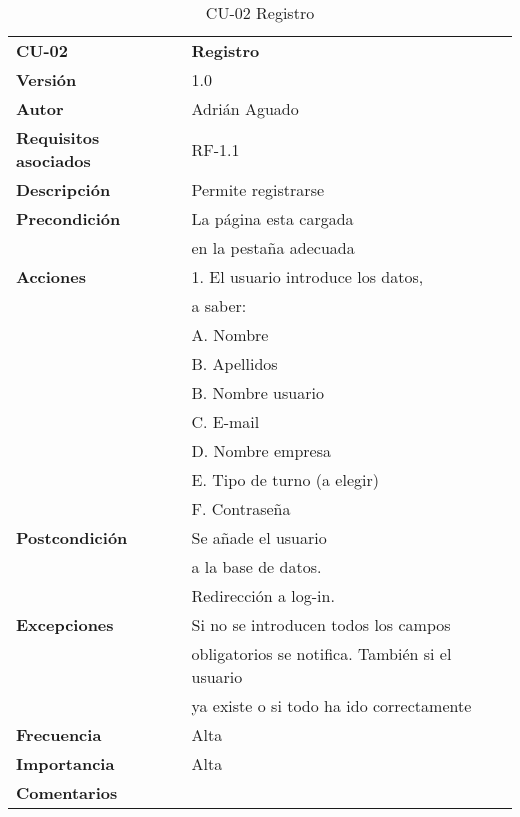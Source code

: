 \begin{table}
\begin{tabular}{llr}  
\toprule
\begin{minipage}[b]{0.24\columnwidth}\raggedright\strut
\textbf{CU-02}\strut
\end{minipage} & \begin{minipage}[b]{0.72\columnwidth}\raggedright\strut
\textbf{Registro}\strut
\end{minipage}\tabularnewline
\cmidrule(r){1-2}
\textbf{Versión}       & 1.0           \\
\textbf{Autor}       & Adrián  Aguado    \\
\textbf{Requisitos asociados}       & RF-1.1 \\ 
\textbf{Descripción} & Permite registrarse\\
\textbf{Precondición} & La página esta cargada  \\
& en la pestaña adecuada     \\
\textbf{Acciones} & 1. El usuario introduce los datos, \\
& a saber: \\
& A. Nombre \\
& B. Apellidos\\
& B. Nombre usuario\\
& C. E-mail\\
& D. Nombre empresa\\
& E. Tipo de turno (a elegir)\\
& F. Contraseña\\
\textbf{Postcondición} & Se añade el usuario \\
& a la base de datos.     \\
& Redirección a log-in.  \\
\textbf{Excepciones} &  Si no se introducen todos los campos  \\
& obligatorios se notifica. También si el usuario \\
& ya existe o si todo ha ido correctamente    \\
\textbf{Frecuencia} & Alta            \\
\textbf{Importancia} & Alta            \\
\textbf{Comentarios } &       \\
\bottomrule
\end{tabular}
\caption{CU-02 Registro} 
\end{table}

